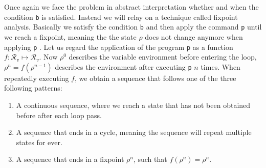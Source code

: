 \noindent Once again we face the problem in abstract interpretation whether and when the condition \texttt{b} is satisfied. Instead we will relay on a technique called fixpoint analysis. Basically we satisfy the condition \texttt{b} and then apply the command \texttt{p} until we reach a fixpoint, meaning the the state $\rho$ does not change anymore when applying \texttt{p} \cite{cousot1977}. Let us regard the application of the program \texttt{p} as a function $f: \mathcal{R}_v\mapsto \mathcal{R}_v$. Now $\rho^0$ describes the variable environment before entering the loop, $\rho^n=f(\rho^{n-1})$ describes the environment after executing \texttt{p} $n$ times. When repeatedly executing $f$, we obtain a sequence that follows one of the three following patterns:

\begin{enumerate}
	\item A continuous sequence, where we reach a state that has not been obtained before after each loop pass.\\
\begin{center}
\end{center}

	\item \parbox[t]{\linewidth}{A sequence that ends in a cycle, meaning the sequence will repeat multiple states for ever.\\
\begin{center}
\end{center}
}
	\item A sequence that ends in a fixpoint $\rho^n$, such that $f(\rho^n)=\rho^n$.\\
\begin{center}
\end{center}
\end{enumerate}
